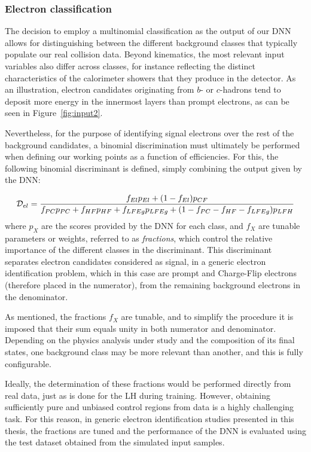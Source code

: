 \subsubsection{Electron classification}

The decision to employ a multinomial classification as the output of our DNN allows for distinguishing between the different background classes that typically populate our real collision data. Beyond kinematics, the most relevant input variables also differ across classes, for instance reflecting the distinct characteristics of the calorimeter showers that they produce in the detector. As an illustration, electron candidates originating from $b$- or $c$-hadrons tend to deposit more energy in the innermost layers than prompt electrons, as can be seen in Figure~\ref{fig:input2}.

Nevertheless, for the purpose of identifying signal electrons over the rest of the background candidates, a binomial discrimination must ultimately be performed when defining our working points as a function of efficiencies.  
For this, the following binomial discriminant is defined, simply combining the output given by the DNN:

\begin{equation}
  \small
  \mathcal{D}_{el} = \frac{f_{El}p_{El} + (1-f_{El})p_{CF}}{f_{PC}p_{PC}+f_{HF}p_{HF}+f_{LFEg}p_{LFEg}+(1-f_{PC}-f_{HF}-f_{LFEg})p_{LFH}}
\label{eq:dnn_discriminant}
\end{equation}
where $p_{X}$ are the scores provided by the DNN for each class, and $f_{X}$ are tunable parameters or weights, referred to as \textit{fractions}, which control the relative importance of the different classes in the discriminant.  
This discriminant separates electron candidates considered as signal, in a generic electron identification problem, which in this case are prompt and Charge-Flip electrons (therefore placed in the numerator), from the remaining background electrons in the denominator.

As mentioned, the fractions $f_{X}$ are tunable, and to simplify the procedure it is imposed that their sum equals unity in both numerator and denominator. Depending on the physics analysis under study and the composition of its final states, one background class may be more relevant than another, and this is fully configurable.

Ideally, the determination of these fractions would be performed directly from real data, just as is done for the LH during training. However, obtaining sufficiently pure and unbiased control regions from data is a highly challenging task.
For this reason, in generic electron identification studies presented in this thesis, the fractions are tuned and the performance of the DNN is evaluated using the test dataset obtained from the simulated input samples. 

